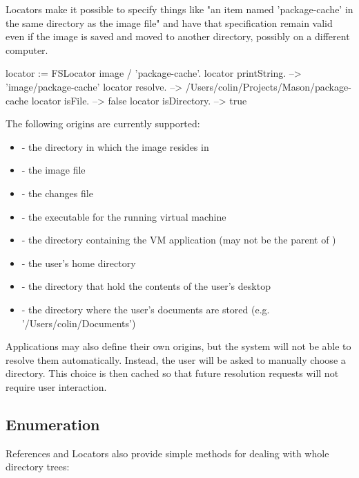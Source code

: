 \documentclass[a4paper,10pt,twoside]{book}
\begin{document}
Locators make it possible to specify things like "an item named 'package-cache' in the same directory as the image file" and have that specification remain valid even if the image is saved and moved to another directory, possibly on a different computer.

\begin{code}{}
    locator := FSLocator image / 'package-cache'.
    locator printString.             --> '{image}/package-cache'
    locator resolve.                 --> /Users/colin/Projects/Mason/package-cache
    locator isFile.                  --> false
    locator isDirectory.             --> true
\end{code}	

The following origins are currently supported:

\begin{itemize}
\item {} - the directory in which the image resides in
\item{} - the image file
\item{} - the changes file
\item{} - the executable for the running virtual machine
\item{} - the directory containing the VM application (may not be the parent of )
\item{} - the user's home directory
\item{} - the directory that hold the contents of the user's desktop
\item{} - the directory where the user's documents are stored (e.g. '/Users/colin/Documents')
\end{itemize}

Applications may also define their own origins, but the system will not be able to resolve them automatically. Instead, the user will be asked to manually choose a directory. This choice is then cached so that future resolution requests will not require user interaction.

\subsection{Enumeration}

References and Locators also provide simple methods for dealing with whole directory trees:
\end{document}
